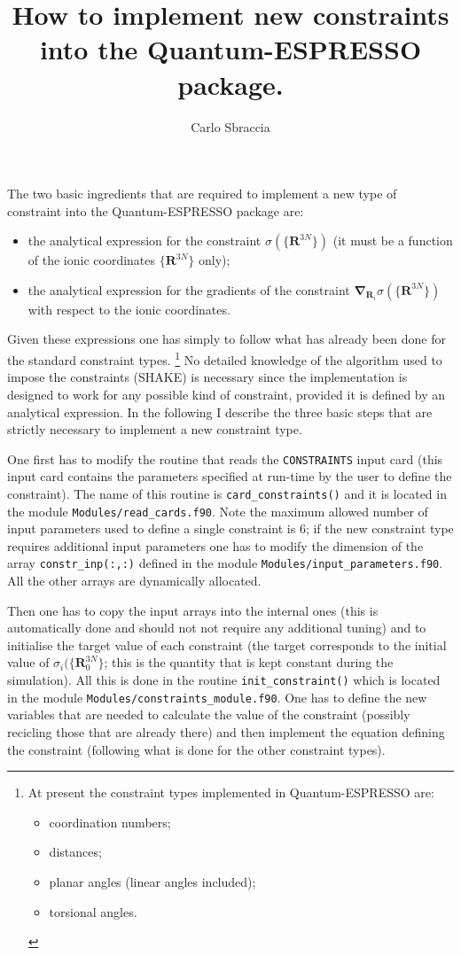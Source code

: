 \documentclass[a4paper,12pt,notitlepage]{report}
\author{Carlo Sbraccia}
\newcommand{\Rb}{\mathbf R}
\newcommand{\nb}{\boldsymbol \nabla}
\begin{document}
\title{How to implement new constraints into the Quantum-ESPRESSO package.}
%
\maketitle

The two basic ingredients that are required to implement a new type of
constraint into the Quantum-ESPRESSO package are:
%
\begin{itemize}
\item the analytical expression for the constraint $\sigma(\{\Rb^{3N}\})$ (it
must be a function of the ionic coordinates $\{\Rb^{3N}\}$ only);
\item the analytical expression for the gradients of the constraint
$\nb_{\Rb_i}\sigma(\{\Rb^{3N}\})$ with respect to the ionic coordinates.
\end{itemize}
%
Given these expressions one has simply to follow what has already been done for
the standard constraint types.%
%
\footnote{At present the constraint types implemented in Quantum-ESPRESSO are:
\begin{itemize}
\item coordination numbers;
\item distances;
\item planar angles (linear angles included);
\item torsional angles.
\end{itemize}}
%
No detailed knowledge of the algorithm used to impose the constraints (SHAKE) is
necessary since the implementation is designed to work for any possible kind of
constraint, provided it is defined by an analytical expression. In the
following I describe the three basic steps that are strictly necessary to
implement a new constraint type.

One first has to modify the routine that reads the \texttt{CONSTRAINTS}
input card (this input card contains the parameters specified at run-time by the
user to define the constraint). The name of this routine is
\texttt{card\_constraints()} and it is located in the module
\texttt{Modules/read\_cards.f90}. Note the maximum allowed number of input
parameters used to define a single constraint is 6; if the new constraint type
requires additional input parameters one has to modify the dimension of the
array \texttt{constr\_inp(:,:)} defined in the module
\texttt{Modules/input\_parameters.f90}. All the other arrays are dynamically
allocated.

Then one has to copy the input arrays into the internal ones (this is
automatically done and should not not require any additional tuning) and to
initialise the target value of each constraint (the target corresponds to the
initial value of $\sigma_i(\{\Rb^{3N}_0\}$; this is the quantity that is kept
constant during the simulation).
All this is done in the routine \texttt{init\_constraint()} which is
located in the module \texttt{Modules/constraints\_module.f90}. One has to
define the new variables that are needed to calculate the value of the
constraint (possibly recicling those that are already there) and then implement
the equation defining the constraint (following what is done for the other
constraint types).
\end{document}
